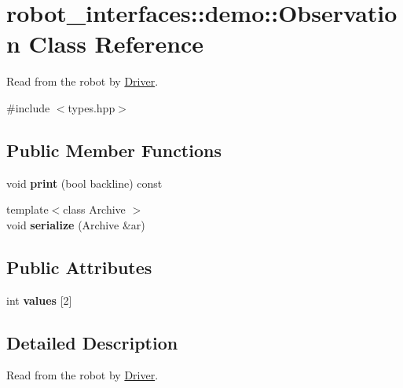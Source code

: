 \hypertarget{classrobot__interfaces_1_1demo_1_1Observation}{}\section{robot\+\_\+interfaces\+:\+:demo\+:\+:Observation Class Reference}
\label{classrobot__interfaces_1_1demo_1_1Observation}


Read from the robot by \hyperlink{classDriver}{Driver}.  




{\ttfamily \#include $<$types.\+hpp$>$}

\subsection*{Public Member Functions}
\begin{DoxyCompactItemize}
\item 
void {\bfseries print} (bool backline) const \hypertarget{classrobot__interfaces_1_1demo_1_1Observation_a59e12a89db80a6b76791e313bcbef8b3}{}\label{classrobot__interfaces_1_1demo_1_1Observation_a59e12a89db80a6b76791e313bcbef8b3}

\item 
{\footnotesize template$<$class Archive $>$ }\\void {\bfseries serialize} (Archive \&ar)\hypertarget{classrobot__interfaces_1_1demo_1_1Observation_adc50512a62b26a896da47f6f67dee44e}{}\label{classrobot__interfaces_1_1demo_1_1Observation_adc50512a62b26a896da47f6f67dee44e}

\end{DoxyCompactItemize}
\subsection*{Public Attributes}
\begin{DoxyCompactItemize}
\item 
int {\bfseries values} \mbox{[}2\mbox{]}\hypertarget{classrobot__interfaces_1_1demo_1_1Observation_a930664896eceed4f3ee0de6f0e29bea4}{}\label{classrobot__interfaces_1_1demo_1_1Observation_a930664896eceed4f3ee0de6f0e29bea4}

\end{DoxyCompactItemize}


\subsection{Detailed Description}
Read from the robot by \hyperlink{classDriver}{Driver}. 

